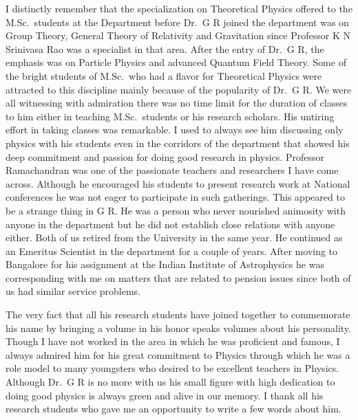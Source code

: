 I distinctly remember that the specialization on Theoretical Physics offered to the M.Sc.\ students at the Department before Dr.\ G R joined the department was on Group Theory, General Theory of Relativity and Gravitation since Professor K N Srinivasa Rao was a specialist in that area. After the entry of Dr.\ G R, the emphasis was on Particle Physics and advanced Quantum Field Theory. Some of the bright students of M.Sc.\ who had a flavor for Theoretical Physics were attracted to this discipline mainly because of the popularity of Dr.\ G R. We were all witnessing with admiration there was no time limit for the duration of classes to him either in teaching M.Sc.\ students or his research scholars. His untiring effort in taking classes was remarkable. I used to always see him discussing only physics with his students even in the corridors of the department that showed his deep commitment and passion for doing good research in physics.  Professor Ramachandran was one of the passionate teachers and researchers I have come across. Although he encouraged his students to present research work at National conferences he was not eager to participate in such gatherings. This appeared to be a strange thing in G R.  He was a person who never nourished animosity with anyone in the department but he did not establish close relations with anyone either. Both of us retired from the University in the same year. He continued as an Emeritus Scientist in the department for a couple of years. After moving to Bangalore for his assignment at the Indian Institute of Astrophysics he was corresponding with me on matters that are related to pension issues since both of us had similar service problems.

The very fact that all his research students have joined together to commemorate his name by bringing a volume in his honor speaks volumes about his personality. Though I have not worked in the area in which he was proficient and famous, I always admired him for his great commitment to Physics through which he was a role model to many youngsters who desired to be excellent teachers in Physics. Although Dr.\ G R is no more with us his small figure with high dedication to doing good physics is always green and alive in our memory. I thank all his research students who gave me an opportunity to write a few words about him.
\newpage

